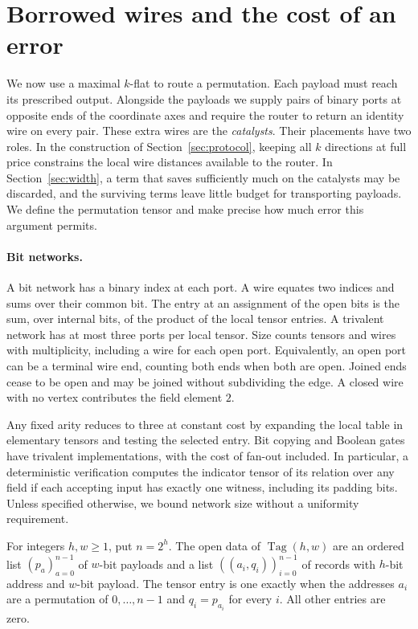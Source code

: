 \section{Borrowed wires and the cost of an error}\label{sec:catalysts}

We now use a maximal $k$-flat to route a permutation. Each payload must
reach its prescribed output. Alongside the payloads we supply pairs of
binary ports at opposite ends of the coordinate axes and require the
router to return an identity wire on every pair. These extra wires are
the \emph{catalysts}. Their placements have two roles. In the construction
of Section~\ref{sec:protocol}, keeping all $k$ directions at full price
constrains the local wire distances available to the router. In
Section~\ref{sec:width}, a term that saves sufficiently much on the
catalysts may be discarded, and the surviving terms leave little budget
for transporting payloads. We define the permutation tensor and make
precise how much error this argument permits.

\paragraph{Bit networks.}
A bit network has a binary index at each port. A wire equates two
indices and sums over their common bit. The entry at an assignment of
the open bits is the sum, over internal bits, of the product of the local
tensor entries. A trivalent network has at most three ports per local
tensor. Size counts tensors and wires with multiplicity, including a wire
for each open port. Equivalently, an open port can be a terminal wire end,
counting both ends when both are open. Joined ends cease to be open and may
be joined without subdividing the edge. A closed wire with no vertex
contributes the field element $2$.

Any fixed arity reduces to three at constant cost by expanding the local
table in elementary tensors and testing the selected entry. Bit copying
and Boolean gates have trivalent implementations, with the cost of
fan-out included. In particular, a deterministic verification computes
the indicator tensor of its relation over any field if each accepting
input has exactly one witness, including its padding bits. Unless
specified otherwise, we bound network size without a uniformity
requirement.

\begin{definition}\label{def:tag}
For integers $h,w\ge1$, put $n=2^h$. The open data of
$\operatorname{Tag}(h,w)$ are an ordered list $(p_a)_{a=0}^{n-1}$ of
$w$-bit payloads and a list $((a_i,q_i))_{i=0}^{n-1}$ of records with
$h$-bit address and $w$-bit payload. The tensor entry is one exactly when
the addresses $a_i$ are a permutation of $0,\ldots,n-1$ and
$q_i=p_{a_i}$ for every $i$. All other entries are zero.
\end{definition}

